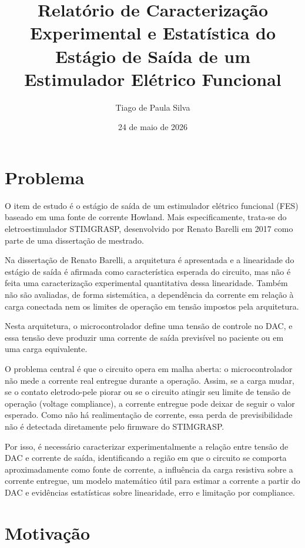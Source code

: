 \documentclass[
  brazilian,
]{article}
\title{Relatório de Caracterização Experimental e Estatística do Estágio
de Saída de um Estimulador Elétrico Funcional}
\author{Tiago de Paula Silva}
\date{24 de maio de 2026}
\renewcommand{\_}{\oldunderscore\discretionary{}{}{}}
\begin{document}
\maketitle

{
\setcounter{tocdepth}{3}
\tableofcontents
}
\section{Problema}\label{problema}

O item de estudo é o estágio de saída de um estimulador elétrico
funcional (FES) baseado em uma fonte de corrente Howland. Mais
especificamente, trata-se do eletroestimulador STIMGRASP, desenvolvido
por Renato Barelli em 2017 como parte de uma dissertação de mestrado.

Na dissertação de Renato Barelli, a arquitetura é apresentada e a
linearidade do estágio de saída é afirmada como característica esperada
do circuito, mas não é feita uma caracterização experimental
quantitativa dessa linearidade. Também não são avaliadas, de forma
sistemática, a dependência da corrente em relação à carga conectada nem
os limites de operação em tensão impostos pela arquitetura.

Nesta arquitetura, o microcontrolador define uma tensão de controle no
DAC, e essa tensão deve produzir uma corrente de saída previsível no
paciente ou em uma carga equivalente.

O problema central é que o circuito opera em malha aberta: o
microcontrolador não mede a corrente real entregue durante a operação.
Assim, se a carga mudar, se o contato eletrodo-pele piorar ou se o
circuito atingir seu limite de tensão de operação (voltage compliance),
a corrente entregue pode deixar de seguir o valor esperado. Como não há
realimentação de corrente, essa perda de previsibilidade não é detectada
diretamente pelo firmware do STIMGRASP.

Por isso, é necessário caracterizar experimentalmente a relação entre
tensão de DAC e corrente de saída, identificando a região em que o
circuito se comporta aproximadamente como fonte de corrente, a
influência da carga resistiva sobre a corrente entregue, um modelo
matemático útil para estimar a corrente a partir do DAC e evidências
estatísticas sobre linearidade, erro e limitação por compliance.

\section{Motivação}\label{motivauxe7uxe3o}
\end{document}

